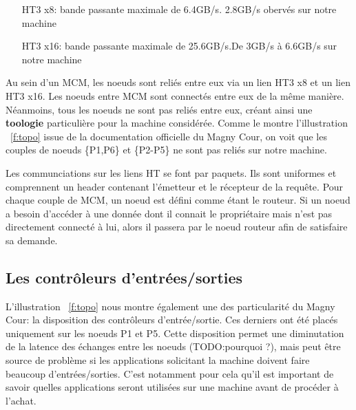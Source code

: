     \begin{itemize}
    \item[HT3 x8:] bande passante maximale de 6.4GB/s. 2.8GB/s obervés sur notre
      machine\cite{Lepers2014}
    \item[HT3 x16:] bande passante maximale de 25.6GB/s.De 3GB/s à 6.6GB/s sur
      notre machine\cite{Lepers2014}
    \end{itemize}

    Au sein d'un MCM, les noeuds sont reliés entre eux via un lien HT3 x8 et un
    lien HT3 x16. Les noeuds entre MCM sont connectés entre eux de la même
    manière. Néanmoins, tous les noeuds ne sont pas reliés entre eux, créant
    ainsi une \textbf{toologie} particulière pour la machine considérée. Comme
    le montre l'illustration ~\ref{f:topo} issue de la documentation officielle
    du Magny Cour, on voit que les couples de noeuds \{P1,P6\} et \{P2-P5\} ne
    sont pas reliés sur notre machine.


    Les communciations sur les liens HT se font par
    paquets\cite{CacheHierarchy}. Ils sont uniformes et comprennent un header
    contenant l'émetteur et le récepteur de la requête. Pour chaque couple de
    MCM, un noeud est défini comme étant le routeur. Si un noeud a besoin
    d'accéder à une donnée dont il connait le propriétaire mais n'est pas
    directement connecté à lui, alors il passera par le noeud routeur afin de
    satisfaire sa demande.

  \subsection{Les contrôleurs d'entrées/sorties}

    L'illustration ~\ref{f:topo} nous montre également une des particularité du
    Magny Cour: la disposition des contrôleurs d'entrée/sortie. Ces derniers ont
    été placés uniquement sur les noeuds P1 et P5. Cette disposition permet une
    diminutation de la latence des échanges entre les noeuds (TODO:pourquoi ?),
    mais peut être source de problème si les applications solicitant la machine
    doivent faire beaucoup d'entrées/sorties. C'est notamment pour cela qu'il
    est important de savoir quelles applications seront utilisées sur une
    machine avant de procéder à l'achat.


